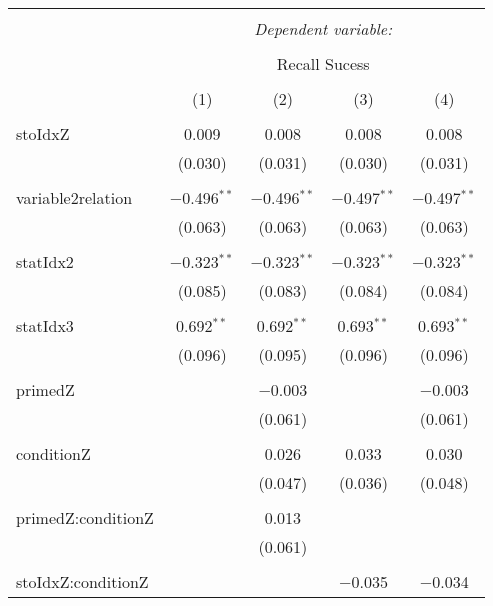 
\begin{table}[!htbp] \centering 
  \caption{} 
  \label{} 
\begin{tabular}{@{\extracolsep{5pt}}lcccc} 
\\[-1.8ex]\hline 
\hline \\[-1.8ex] 
 & \multicolumn{4}{c}{\textit{Dependent variable:}} \\ 
\cline{2-5} 
\\[-1.8ex] & \multicolumn{4}{c}{Recall Sucess} \\ 
\\[-1.8ex] & (1) & (2) & (3) & (4)\\ 
\hline \\[-1.8ex] 
 stoIdxZ & 0.009 & 0.008 & 0.008 & 0.008 \\ 
  & (0.030) & (0.031) & (0.030) & (0.031) \\ 
  & & & & \\ 
 variable2relation & $-$0.496$^{**}$ & $-$0.496$^{**}$ & $-$0.497$^{**}$ & $-$0.497$^{**}$ \\ 
  & (0.063) & (0.063) & (0.063) & (0.063) \\ 
  & & & & \\ 
 statIdx2 & $-$0.323$^{**}$ & $-$0.323$^{**}$ & $-$0.323$^{**}$ & $-$0.323$^{**}$ \\ 
  & (0.085) & (0.083) & (0.084) & (0.084) \\ 
  & & & & \\ 
 statIdx3 & 0.692$^{**}$ & 0.692$^{**}$ & 0.693$^{**}$ & 0.693$^{**}$ \\ 
  & (0.096) & (0.095) & (0.096) & (0.096) \\ 
  & & & & \\ 
 primedZ &  & $-$0.003 &  & $-$0.003 \\ 
  &  & (0.061) &  & (0.061) \\ 
  & & & & \\ 
 conditionZ &  & 0.026 & 0.033 & 0.030 \\ 
  &  & (0.047) & (0.036) & (0.048) \\ 
  & & & & \\ 
 primedZ:conditionZ &  & 0.013 &  &  \\ 
  &  & (0.061) &  &  \\ 
  & & & & \\ 
 stoIdxZ:conditionZ &  &  & $-$0.035 & $-$0.034 \\ 

\end{tabular}
\end{table}
